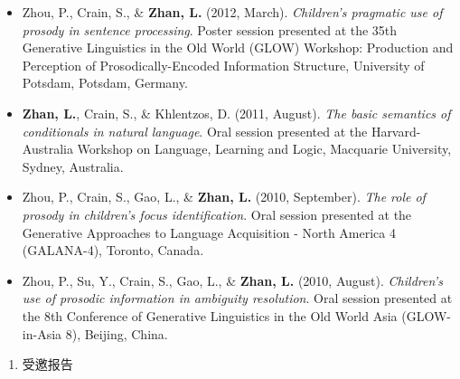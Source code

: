 \documentclass[12pt,]{article}
\providecommand{\tightlist}{%
  \setlength{\itemsep}{0pt}\setlength{\parskip}{0pt}}
\begin{document}
\begin{itemize}
{  interpretation of conditionals}. Oral session presented at the 7th
  International Conference on Thinking (ICT2012), Birkbeck/UCL, London,
  UK.
\item
  Zhou, P., Crain, S., \& \textbf{Zhan, L.} (2012, March).
  \emph{Children's pragmatic use of prosody in sentence processing}.
  Poster session presented at the 35th Generative Linguistics in the Old
  World (GLOW) Workshop: Production and Perception of
  Prosodically-Encoded Information Structure, University of Potsdam,
  Potsdam, Germany.
\item
  \textbf{Zhan, L.}, Crain, S., \& Khlentzos, D. (2011, August).
  \emph{The basic semantics of conditionals in natural language}. Oral
  session presented at the Harvard-Australia Workshop on Language,
  Learning and Logic, Macquarie University, Sydney, Australia.
\item
  Zhou, P., Crain, S., Gao, L., \& \textbf{Zhan, L.} (2010, September).
  \emph{The role of prosody in children's focus identification}. Oral
  session presented at the Generative Approaches to Language Acquisition
  - North America 4 (GALANA-4), Toronto, Canada.
\item
  Zhou, P., Su, Y., Crain, S., Gao, L., \& \textbf{Zhan, L.} (2010,
  August). \emph{Children's use of prosodic information in ambiguity
  resolution}. Oral session presented at the 8th Conference of
  Generative Linguistics in the Old World Asia (GLOW-in-Asia 8),
  Beijing, China.
\end{itemize}

\begin{enumerate}
\def\labelenumi{\arabic{enumi}.}
\setcounter{enumi}{4}
\tightlist
\item
  受邀报告
\end{enumerate}
\end{document}
